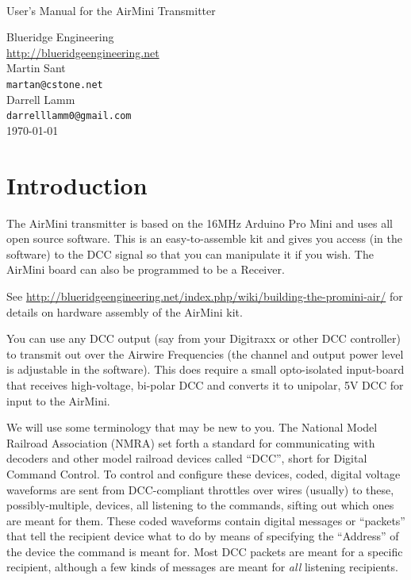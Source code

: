 \documentclass[12pt]{article}
\begin{document}
%
\begin{titlepage}
\centering
\ \\%
\vspace{3in}
{\Large \textsf{User's Manual for the AirMini Transmitter}} \\
\vspace{1.5in}

\textsf{Blueridge Engineering}\\
\url{http://blueridgeengineering.net}\\

\vspace{0.5in}
Martin Sant \\
\texttt{martan@cstone.net}\\
Darrell Lamm\\
\texttt{darrelllamm0@gmail.com}\\

\vspace{1.0in}
\today \\
\end{titlepage}
\newpage

\tableofcontents

\newpage

\section{Introduction}
The AirMini transmitter is based on the 16MHz Arduino Pro Mini and uses all open source software. 
This is an easy-to-assemble kit and gives you access (in the software) to the DCC signal so that you can manipulate it if you wish. 
The AirMini board can also be programmed to be a Receiver. 

See {\small\url{http://blueridgeengineering.net/index.php/wiki/building-the-promini-air/}} for details on hardware assembly of the AirMini kit.

You can use any DCC output (say from your Digitraxx or other DCC controller) to transmit out over the Airwire Frequencies (the channel and output power level is adjustable in the software).
This does require a small opto-isolated input-board that receives high-voltage, bi-polar DCC and converts it to unipolar, 5V DCC for input to the AirMini.

We will use some terminology that may be new to you. 
The National Model Railroad Association (NMRA) set forth a standard for communicating with decoders and other model railroad devices called ``DCC'', short for Digital Command Control.
To control and configure these devices, coded, digital voltage waveforms are sent from DCC-compliant throttles over wires (usually) to these, possibly-multiple, devices, all listening to the commands, sifting out which ones are meant for them.
These coded waveforms contain digital messages or ``packets'' that tell the recipient device what to do by means of specifying the ``Address'' of the device the command is meant for.
Most DCC packets are meant for a specific recipient, although a few kinds of messages are meant for {\em all} listening recipients.
\end{document}
